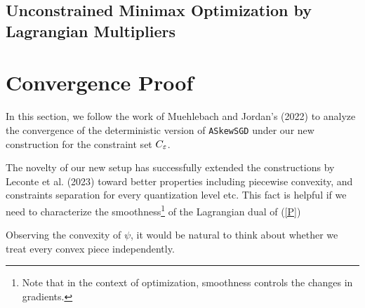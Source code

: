 \documentclass[10pt,a4paper]{article}
\begin{document}
\subsection{Unconstrained Minimax Optimization by Lagrangian Multipliers} \phantom{}

\section{Convergence Proof}

In this section, we follow the work of Muehlebach and Jordan's (2022) to analyze the convergence of the deterministic version of \texttt{ASkewSGD} under our new construction for the constraint set $C_{\varepsilon}$.

The novelty of our new setup has successfully extended the constructions by Leconte et al. (2023) toward better properties including piecewise convexity, and constraints separation for every quantization level etc. This fact is helpful if we need to characterize the smoothness\footnote{Note that in the context of optimization, smoothness controls the changes in gradients.} of the Lagrangian dual of (\ref{P})


Observing the convexity of $\psi$, it would be natural to think about whether we treat every convex piece independently.
\end{document}
